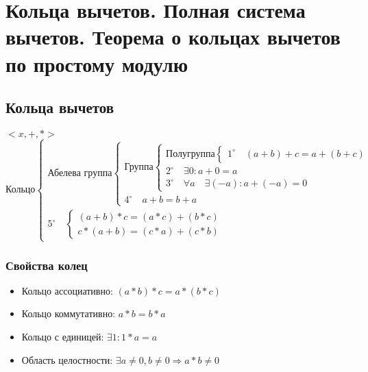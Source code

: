 \documentclass[12pt]{article}
\begin{document}
\setcounter{section}{5}
\section{Кольца вычетов. Полная система вычетов. Теорема о кольцах вычетов по простому модулю}
\subsection{Кольца вычетов}
$<x,+,*>$
\begin{equation*}
    \text{Кольцо}
    \begin{cases}
        \text{Абелева группа}
        \begin{cases}
            \text{Группа}
            \begin{cases}
                \text{Полугруппа}
                \begin{cases}
                    1^{\circ} \quad (a+b)+c = a+(b+c)
                \end{cases}
                \\
                2^{\circ} \quad \exists 0: a+0 = a
                \\
                3^{\circ} \quad \forall a \quad\exists (-a): a + (-a) = 0
            \end{cases}
            \\
            4^{\circ} \quad a + b = b + a
        \end{cases}
        \\
        5^{\circ} \quad \begin{cases}
                            (a+b)*c = (a*c) + (b*c)
                            \\
                            c*(a+b) = (c*a) + (c*b)
                        \end{cases}
    \end{cases}
\end{equation*}

\subsubsection{Свойства колец}
\begin{itemize}
    \item Кольцо ассоциативно: $(a*b)*c = a*(b*c)$
    \item Кольцо коммутативно: $a*b = b*a$
    \item Кольцо с единицей: $\exists 1: 1*a = a$
    \item Область целостности: $\exists a\ne 0, b \ne 0 \Rightarrow a*b \ne 0$
\end{itemize}
\end{document}
